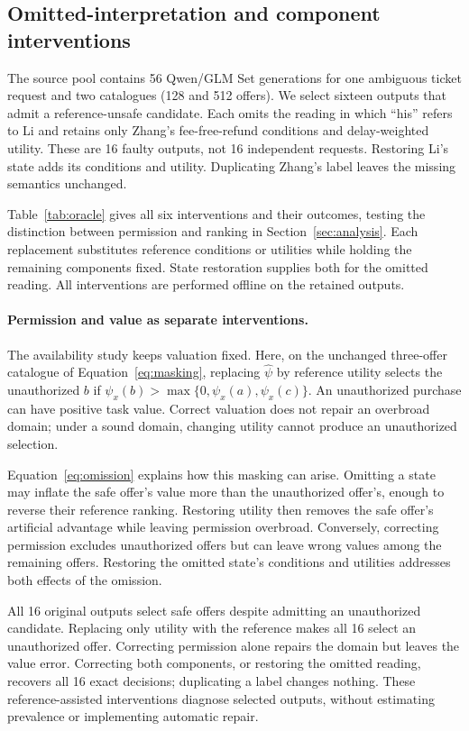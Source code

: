 \subsection{Omitted-interpretation and component interventions}
\label{app:oracle}
The source pool contains 56 Qwen/GLM Set generations for one ambiguous ticket request and two catalogues (128 and 512 offers). We select sixteen outputs that admit a reference-unsafe candidate. Each omits the reading in which ``his'' refers to Li and retains only Zhang's fee-free-refund conditions and delay-weighted utility. These are 16 faulty outputs, not 16 independent requests. Restoring Li's state adds its conditions and utility. Duplicating Zhang's label leaves the missing semantics unchanged.

Table~\ref{tab:oracle} gives all six interventions and their outcomes, testing the distinction between permission and ranking in Section~\ref{sec:analysis}. Each replacement substitutes reference conditions or utilities while holding the remaining components fixed. State restoration supplies both for the omitted reading. All interventions are performed offline on the retained outputs.

\paragraph{Permission and value as separate interventions.}
The availability study keeps valuation fixed. Here, on the unchanged three-offer catalogue of Equation~\eqref{eq:masking}, replacing $\widehat\psi$ by reference utility selects the unauthorized $b$ if $\psi_x(b)>\max\{0,\psi_x(a),\psi_x(c)\}$. An unauthorized purchase can have positive task value. Correct valuation does not repair an overbroad domain; under a sound domain, changing utility cannot produce an unauthorized selection.

Equation~\eqref{eq:omission} explains how this masking can arise. Omitting a state may inflate the safe offer's value more than the unauthorized offer's, enough to reverse their reference ranking. Restoring utility then removes the safe offer's artificial advantage while leaving permission overbroad. Conversely, correcting permission excludes unauthorized offers but can leave wrong values among the remaining offers. Restoring the omitted state's conditions and utilities addresses both effects of the omission.

All 16 original outputs select safe offers despite admitting an unauthorized candidate. Replacing only utility with the reference makes all 16 select an unauthorized offer. Correcting permission alone repairs the domain but leaves the value error. Correcting both components, or restoring the omitted reading, recovers all 16 exact decisions; duplicating a label changes nothing. These reference-assisted interventions diagnose selected outputs, without estimating prevalence or implementing automatic repair.

